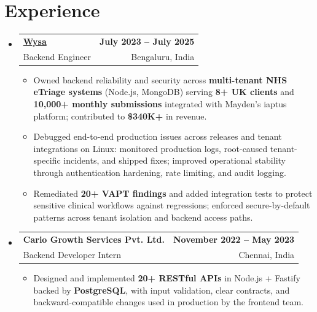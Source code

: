 \documentclass[letterpaper,10pt]{article}
\makeatletter
\newcommand{\resumeItem}[1]{
  \item\small{#1\vspace{-1pt}}
}
\newcommand{\resumeSubheading}[4]{
  \vspace{1pt}\item
    \begin{tabular*}{0.985\textwidth}[t]{l@{\extracolsep{\fill}}r}
      \textbf{#1} & \textbf{\small #2} \\
      {\small\color{ResumeSlate} #3} & {\small\color{ResumeSlate} #4} \\
    \end{tabular*}\vspace{-6pt}
}
\newcommand{\resumeSubHeadingListStart}{\begin{itemize}[leftmargin=0.0in, label={}, itemsep=2pt, topsep=2pt]}
\newcommand{\resumeSubHeadingListEnd}{\end{itemize}}
\newcommand{\resumeItemListStart}{\begin{itemize}[leftmargin=0.18in, itemsep=2pt, topsep=1pt]}
\newcommand{\resumeItemListEnd}{\end{itemize}\vspace{-4pt}}
\makeatother
\begin{document}
\section{Experience}
\resumeSubHeadingListStart
  \resumeSubheading
    {\href{https://www.wysa.io}{Wysa}}{July 2023 -- July 2025}
    {Backend Engineer}{Bengaluru, India}
    \resumeItemListStart
      \resumeItem{Owned backend reliability and security across \textbf{multi-tenant NHS eTriage systems} (Node.js, MongoDB) serving \textbf{8+ UK clients} and \textbf{10{,}000+ monthly submissions} integrated with Mayden's iaptus platform; contributed to \textbf{\$340K+} in revenue.}
      \resumeItem{Debugged end-to-end production issues across releases and tenant integrations on Linux: monitored production logs, root-caused tenant-specific incidents, and shipped fixes; improved operational stability through authentication hardening, rate limiting, and audit logging.}
      \resumeItem{Remediated \textbf{20+ VAPT findings} and added integration tests to protect sensitive clinical workflows against regressions; enforced secure-by-default patterns across tenant isolation and backend access paths.}
    \resumeItemListEnd
  \resumeSubheading
    {Cario Growth Services Pvt. Ltd.}{November 2022 -- May 2023}
    {Backend Developer Intern}{Chennai, India}
    \resumeItemListStart
      \resumeItem{Designed and implemented \textbf{20+ RESTful APIs} in Node.js + Fastify backed by \textbf{PostgreSQL}, with input validation, clear contracts, and backward-compatible changes used in production by the frontend team.}
    \resumeItemListEnd
\resumeSubHeadingListEnd
\vspace{-4pt}
\end{document}

